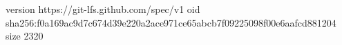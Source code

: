 version https://git-lfs.github.com/spec/v1
oid sha256:f0a169ac9d7c674d39e220a2ace971ce65abcb7f09225098f00e6aafcd881204
size 2320
